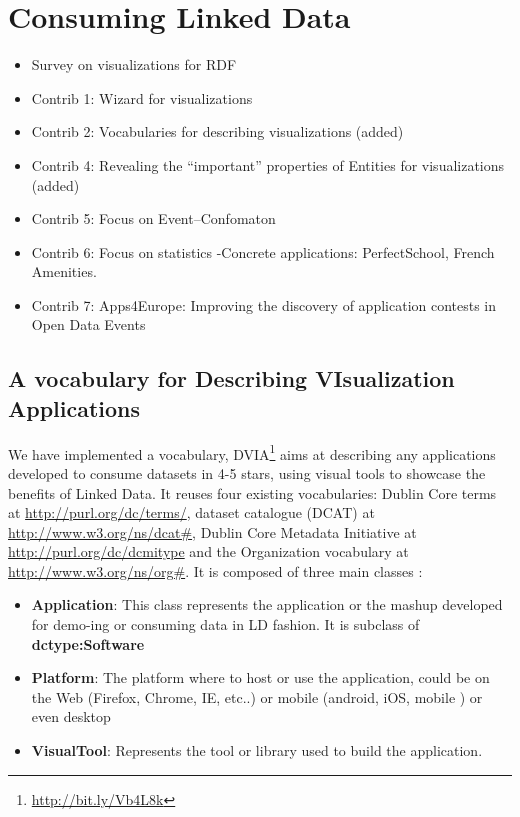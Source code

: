 \chapter{Consuming Linked Data}
\label{ch:ch5}

\begin{itemize}
\item Survey on visualizations for RDF
\item Contrib 1: Wizard for visualizations
\item Contrib 2: Vocabularies for describing visualizations (added)
\item Contrib 4: Revealing the ``important'' properties of Entities for visualizations (added)
\item Contrib 5: Focus on Event--Confomaton
\item Contrib 6: Focus on statistics -Concrete applications: PerfectSchool, French Amenities.
\item Contrib 7: Apps4Europe: Improving the discovery of application contests in Open Data Events

\end{itemize}


\section{A vocabulary for Describing VIsualization Applications} \label{sec:dvia}

We have implemented a vocabulary, DVIA\footnote{\url{http://bit.ly/Vb4L8k}} aims at describing any applications developed to consume datasets in 4-5 stars, using visual tools to showcase the benefits of Linked Data. It reuses four existing vocabularies: Dublin Core terms at \url{http://purl.org/dc/terms/}, dataset catalogue (DCAT) at \url{http://www.w3.org/ns/dcat#}, Dublin Core Metadata Initiative at \url{http://purl.org/dc/dcmitype} and the Organization vocabulary at \url{http://www.w3.org/ns/org#}.  It is composed of three main classes : 

\begin{itemize}
\item \textbf{Application}: This class represents the application or the mashup developed for demo-ing or consuming data in LD fashion. It is subclass of \textbf{dctype:Software}
\item \textbf{Platform}: The platform where to host or use the application, could be on the Web (Firefox, Chrome, IE, etc..) or mobile (android, iOS, mobile ) or even desktop
\item \textbf{VisualTool}: Represents the tool or library used to build the application. 
\end{itemize}


